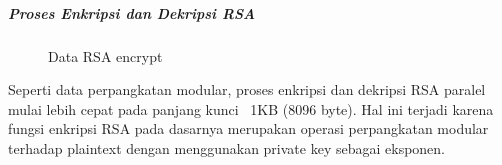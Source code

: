       \subparagraph{Proses Enkripsi dan Dekripsi RSA}

        \begin{figure}[h]
          \centering
          \caption{Data RSA encrypt}
          \label{fig:data_rsa_enc}
        \end{figure}

        Seperti data perpangkatan modular, proses enkripsi dan dekripsi RSA paralel mulai lebih cepat pada panjang kunci ~1KB (8096 byte). Hal ini terjadi karena fungsi enkripsi RSA pada dasarnya merupakan operasi perpangkatan modular terhadap plaintext dengan menggunakan private key sebagai eksponen.
